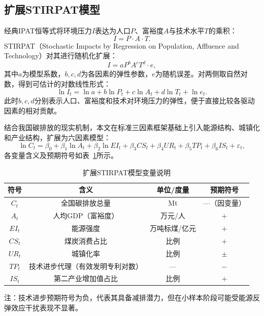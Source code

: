 \subsection{扩展STIRPAT模型}
经典IPAT恒等式将环境压力$I$表达为人口$P$、富裕度$A$与技术水平$T$的乘积：
\begin{equation}
I = P \cdot A \cdot T.
\end{equation}
STIRPAT（Stochastic Impacts by Regression on Population, Affluence and Technology）对其进行随机化扩展：
\begin{equation}
I = a P^b A^c T^d \cdot e,
\end{equation}
其中$a$为模型系数，$b,c,d$为各因素的弹性参数，$e$为随机误差。对两侧取自然对数，得到可估计的对数线性形式：
\begin{equation}
\ln I_t = \ln a + b\ln P_t + c\ln A_t + d\ln T_t + \ln e_t.
\end{equation}
此时$b,c,d$分别表示人口、富裕度和技术对环境压力的弹性，便于直接比较各驱动因素的相对贡献。

结合我国碳排放的现实机制，本文在标准三因素框架基础上引入能源结构、城镇化和产业结构，扩展为六因素模型：
\begin{equation}
\ln C_t = \beta_0 + \beta_1 \ln A_t + \beta_2 \ln EI_t + \beta_3 CS_t + \beta_4 UR_t + \beta_5 TP_t + \beta_6 IS_t + \varepsilon_t,
\end{equation}
各变量含义及预期符号如表~\ref{tab:stirpat_vars}所示。

\begin{table}[H]
\centering
\caption{扩展STIRPAT模型变量说明}
\label{tab:stirpat_vars}
\begin{tabular}{cccc}
\toprule
符号 & 含义 & 单位/度量 & 预期符号 \\
\midrule
$C_t$  & 全国碳排放总量    & Mt         & —（因变量）\\
$A_t$  & 人均GDP（富裕度） & 万元/人    & $+$ \\
$EI_t$ & 能源强度          & 万吨标煤/亿元 & $+$ \\
$CS_t$ & 煤炭消费占比      & 比例        & $+$ \\
$UR_t$ & 城镇化率          & 比例        & $\pm$ \\
$TP_t$ & 技术进步代理（有效发明专利对数） & — & $-$ \\
$IS_t$ & 第二产业增加值占比 & 比例       & $+$ \\
\bottomrule
\end{tabular}
{\footnotesize 注：技术进步预期符号为负，代表其具备减排潜力，但在小样本阶段可能受能源反弹效应干扰表现不显著。}
\end{table}

